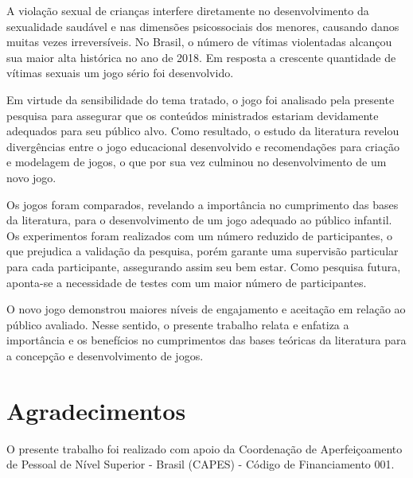 \documentclass[alpha-refs,brazilian]{RBCA_v2.0}
\begin{document}
A violação sexual de crianças interfere diretamente no desenvolvimento da sexualidade saudável e nas dimensões psicossociais dos menores, causando danos muitas vezes irreversíveis. No Brasil, o número de vítimas violentadas alcançou sua maior alta histórica no ano de 2018. Em resposta a crescente quantidade de vítimas sexuais um jogo sério foi desenvolvido.

Em virtude da sensibilidade do tema tratado, o jogo foi analisado pela presente pesquisa para assegurar que os conteúdos ministrados estariam devidamente adequados para seu público alvo. Como resultado, o estudo da literatura revelou divergências entre o jogo educacional desenvolvido e recomendações para criação e modelagem de jogos, o que por sua vez culminou no desenvolvimento de um novo jogo.

Os jogos foram comparados, revelando a importância no cumprimento das bases da literatura, para o desenvolvimento de um jogo adequado ao público infantil. Os experimentos foram realizados com um número reduzido de participantes, o que prejudica a validação da pesquisa, porém garante uma supervisão particular para cada participante, assegurando assim seu bem estar. Como pesquisa futura, aponta-se a necessidade de testes com um maior número de participantes.

O novo jogo demonstrou maiores níveis de engajamento e aceitação em relação ao público avaliado. Nesse sentido, o presente trabalho relata e enfatiza a importância e os benefícios no cumprimentos das bases teóricas da literatura para a concepção e desenvolvimento de jogos.

\newpage

\section*{Agradecimentos}

O presente trabalho foi realizado com apoio da Coordenação de Aperfeiçoamento de Pessoal de Nível Superior - Brasil (CAPES) - Código de Financiamento 001.


\end{document}
